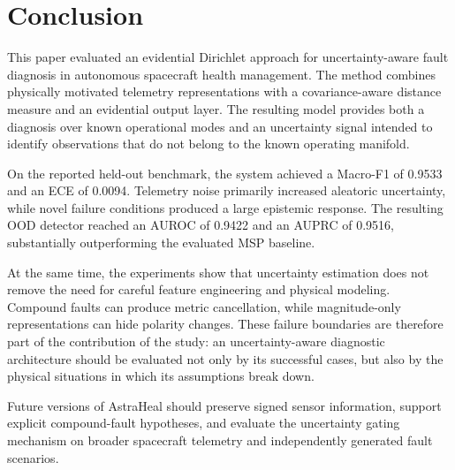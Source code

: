\documentclass[conference]{IEEEtran}
\begin{document}
\section{Conclusion}

This paper evaluated an evidential Dirichlet approach for uncertainty-aware fault diagnosis in autonomous spacecraft health management. The method combines physically motivated telemetry representations with a covariance-aware distance measure and an evidential output layer. The resulting model provides both a diagnosis over known operational modes and an uncertainty signal intended to identify observations that do not belong to the known operating manifold.

On the reported held-out benchmark, the system achieved a Macro-F1 of 0.9533 and an ECE of 0.0094. Telemetry noise primarily increased aleatoric uncertainty, while novel failure conditions produced a large epistemic response. The resulting OOD detector reached an AUROC of 0.9422 and an AUPRC of 0.9516, substantially outperforming the evaluated MSP baseline.

At the same time, the experiments show that uncertainty estimation does not remove the need for careful feature engineering and physical modeling. Compound faults can produce metric cancellation, while magnitude-only representations can hide polarity changes. These failure boundaries are therefore part of the contribution of the study: an uncertainty-aware diagnostic architecture should be evaluated not only by its successful cases, but also by the physical situations in which its assumptions break down.

Future versions of AstraHeal should preserve signed sensor information, support explicit compound-fault hypotheses, and evaluate the uncertainty gating mechanism on broader spacecraft telemetry and independently generated fault scenarios.



\end{document}
